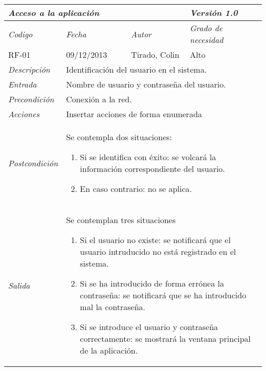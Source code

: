 \begin{tabular}{|p{3cm}|p{4cm}|p{4cm}|p{4cm}|}
\hline \multicolumn{3}{|p{9cm}|}{\textit{Acceso a la aplicaci\'on}} & \textit{Versi\'on 1.0} \\
\hline \textit{Codigo} & \textit{Fecha} & \textit{Autor} & \textit{Grado de necesidad} \\
RF-01 & 09/12/2013 & Tirado, Colin & Alto \\
\hline \textit{Descripci\'on} & \multicolumn{3}{|p{9cm}|}{Identificaci\'on del usuario en el sistema.} \\
\hline \textit{Entrada} & \multicolumn{3}{|p{9cm}|}{Nombre de usuario y contrase\~na del usuario.} \\
\hline \textit{Precondici\'on} & \multicolumn{3}{|p{9cm}|}{Conexi\'on a la red.} \\
\hline \textit{Acciones} & \multicolumn{3}{|p{9cm}|}{Insertar acciones de forma enumerada} \\
\hline \textit{Postcondici\'on} & \multicolumn{3}{|p{9cm}|}{Se contempla dos situaciones:
\begin{enumerate}
\item Si se identifica con \'exito: se volcar\'a la informaci\'on correspondiente del usuario.
\item En caso contrario: no se aplica.
\end{enumerate}
} \\
\hline \textit{Salida} & \multicolumn{3}{|p{9cm}|}{Se contemplan tres situaciones
\begin{enumerate}
\item Si el usuario no existe: se notificar\'a que el usuario intruducido no est\'a registrado en el sistema.
\item Si se ha introducido de forma err\'onea la contrase\~na: se notificar\'a que se ha introducido mal la contrase\~na.
\item Si se introduce el usuario y contrase\~na correctamente: se mostrar\'a la ventana principal de la aplicaci\'on.
\end{enumerate} } \\ \hline
\end{tabular}